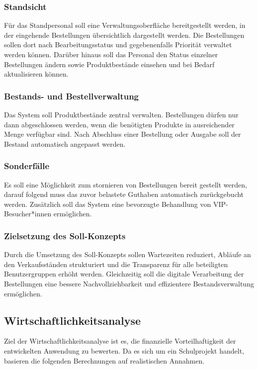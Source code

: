 \subsubsection{Standsicht}
Für das Standpersonal soll eine Verwaltungsoberfläche bereitgestellt werden, in der eingehende Bestellungen übersichtlich dargestellt werden. Die Bestellungen
sollen dort nach Bearbeitungsstatus und gegebenenfalls Priorität verwaltet werden können. Darüber hinaus soll das Personal den Status einzelner Bestellungen ändern
sowie Produktbestände einsehen und bei Bedarf aktualisieren können.

\subsubsection{Bestands- und Bestellverwaltung}
Das System soll Produktbestände zentral verwalten. Bestellungen dürfen nur dann abgeschlossen werden, wenn die benötigten Produkte in ausreichender Menge verfügbar sind.
Nach Abschluss einer Bestellung oder Ausgabe soll der Bestand automatisch angepasst werden.

\subsubsection{Sonderfälle}
Es soll eine Möglichkeit zum stornieren von Bestellungen bereit gestellt werden, darauf folgend muss das zuvor belastete Guthaben automatisch zurückgebucht werden. 
Zusätzlich soll das System eine bevorzugte Behandlung von \acs{VIP}-Besucher*innen ermöglichen.

\subsubsection{Zielsetzung des Soll-Konzepts}
Durch die Umsetzung des Soll-Konzepts sollen Wartezeiten reduziert, Abläufe an den Verkaufsständen strukturiert und die Transparenz für alle beteiligten Benutzergruppen
erhöht werden. Gleichzeitig soll die digitale Verarbeitung der Bestellungen eine bessere Nachvollziehbarkeit und effizientere Bestandsverwaltung ermöglichen.

\subsection{Wirtschaftlichkeitsanalyse}
\label{sec:Wirtschaftlichkeitsanalyse}
Ziel der Wirtschaftlichkeitsanalyse ist es, die finanzielle Vorteilhaftigkeit der entwickelten Anwendung zu bewerten. 
Da es sich um ein Schulprojekt handelt, basieren die folgenden Berechnungen auf realistischen Annahmen.

